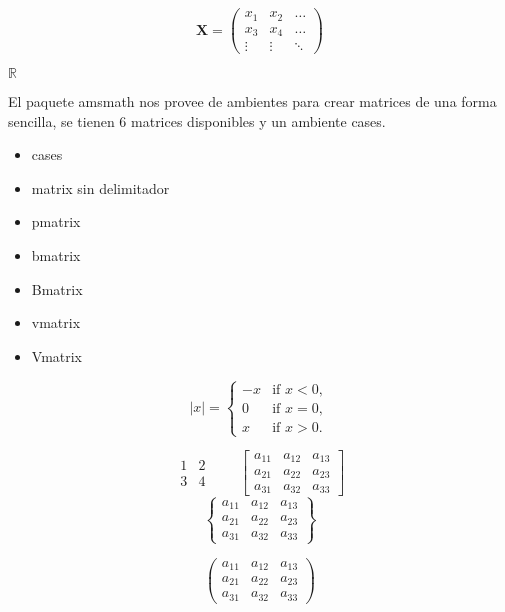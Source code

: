 \documentclass{report}
\begin{document}
\begin{equation*}
\mathbf{X} = \left(
\begin{array}{ccc}
x_1 & x_2 & \ldots \\
x_3 & x_4 & \ldots \\
\vdots & \vdots & \ddots
\end{array} \right)
\end{equation*}


$\mathbb{R}$

El paquete amsmath nos provee de ambientes para crear matrices de una forma sencilla, se tienen 6 matrices disponibles y un ambiente cases.
\begin{itemize}
	\item cases
	\item matrix sin delimitador
	\item pmatrix
	\item bmatrix
	\item Bmatrix
	\item vmatrix
	\item Vmatrix
\end{itemize}

\begin{equation*}
|x| =
\begin{cases}
-x & \text{if } x < 0,\\
0 & \text{if } x = 0,\\
x & \text{if } x > 0.
\end{cases}
\end{equation*}


\begin{equation*}
\begin{matrix}
1 & 2 \\
3 & 4
\end{matrix}
\qquad
\begin{bmatrix}
a_{11} & a_{12} & a_{13}\\
a_{21} & a_{22} & a_{23}\\
a_{31} & a_{32} & a_{33}
\end{bmatrix}
\end{equation*}
\[
\begin{Bmatrix}
	a_{11} & a_{12} & a_{13}\\
	a_{21} & a_{22} & a_{23}\\
	a_{31} & a_{32} & a_{33}
\end{Bmatrix}
\]

\[
\begin{pmatrix}
a_{11} & a_{12} & a_{13}\\
a_{21} & a_{22} & a_{23}\\
a_{31} & a_{32} & a_{33}
\end{pmatrix}
\]
\end{document}
